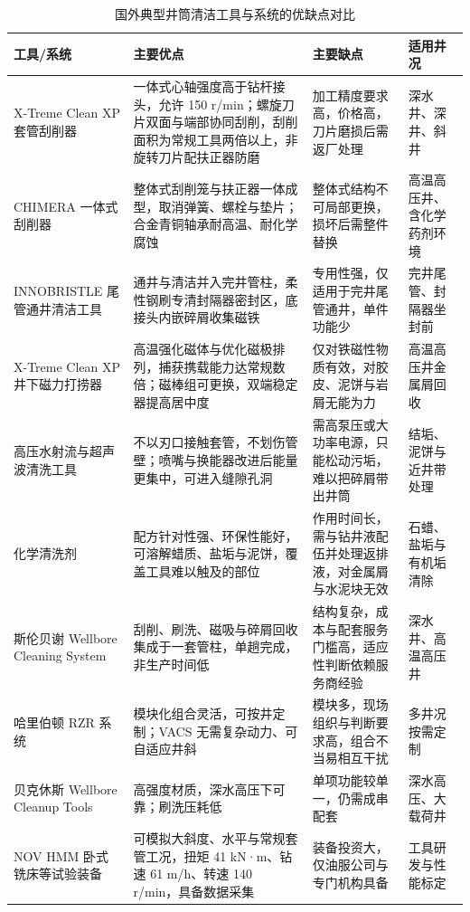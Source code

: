 \begin{table}[H]
	\centering
	\caption{国外典型井筒清洁工具与系统的优缺点对比}
	\label{tab:foreign-tools}
	\footnotesize
	\renewcommand{\arraystretch}{1.3}
	\begin{tabularx}{\textwidth}{@{}>{\raggedright\arraybackslash}p{3.2cm}>{\raggedright\arraybackslash}X>{\raggedright\arraybackslash}X>{\raggedright\arraybackslash}p{2.6cm}@{}}
		\toprule
		工具/系统 & 主要优点 & 主要缺点 & 适用井况 \\
		\midrule
		X-Treme Clean XP 套管刮削器 & 一体式心轴强度高于钻杆接头，允许 150 r/min；螺旋刀片双面与端部协同刮削，刮削面积为常规工具两倍以上，非旋转刀片配扶正器防磨 & 加工精度要求高，价格高，刀片磨损后需返厂处理 & 深水井、深井、斜井 \\
		CHIMERA 一体式刮削器 & 整体式刮削笼与扶正器一体成型，取消弹簧、螺栓与垫片；合金青铜轴承耐高温、耐化学腐蚀 & 整体式结构不可局部更换，损坏后需整件替换 & 高温高压井、含化学药剂环境 \\
		INNOBRISTLE 尾管通井清洁工具 & 通井与清洁并入完井管柱，柔性钢刷专清封隔器密封区，底接头内嵌碎屑收集磁铁 & 专用性强，仅适用于完井尾管通井，单件功能少 & 完井尾管、封隔器坐封前 \\
		X-Treme Clean XP 井下磁力打捞器 & 高温强化磁体与优化磁极排列，捕获携载能力达常规数倍；磁棒组可更换，双端稳定器提高居中度 & 仅对铁磁性物质有效，对胶皮、泥饼与岩屑无能为力 & 高温高压井金属屑回收 \\
		高压水射流与超声波清洗工具 & 不以刃口接触套管，不划伤管壁；喷嘴与换能器改进后能量更集中，可进入缝隙孔洞 & 需高泵压或大功率电源，只能松动污垢，难以把碎屑带出井筒 & 结垢、泥饼与近井带处理 \\
		化学清洗剂 & 配方针对性强、环保性能好，可溶解蜡质、盐垢与泥饼，覆盖工具难以触及的部位 & 作用时间长，需与钻井液配伍并处理返排液，对金属屑与水泥块无效 & 石蜡、盐垢与有机垢清除 \\
		斯伦贝谢 Wellbore Cleaning System & 刮削、刷洗、磁吸与碎屑回收集成于一套管柱，单趟完成，非生产时间低 & 结构复杂，成本与配套服务门槛高，适应性判断依赖服务商经验 & 深水井、高温高压井 \\
		哈里伯顿 RZR 系统 & 模块化组合灵活，可按井定制；VACS 无需复杂动力、可自适应井斜 & 模块多，现场组织与判断要求高，组合不当易相互干扰 & 多井况按需定制 \\
		贝克休斯 Wellbore Cleanup Tools & 高强度材质，深水高压下可靠；刷洗压耗低 & 单项功能较单一，仍需成串配套 & 深水高压、大载荷井 \\
		NOV HMM 卧式铣床等试验装备 & 可模拟大斜度、水平与常规套管工况，扭矩 41 kN·m、钻速 61 m/h、转速 140 r/min，具备数据采集 & 装备投资大，仅油服公司与专门机构具备 & 工具研发与性能标定 \\
		\bottomrule
	\end{tabularx}
\end{table}

